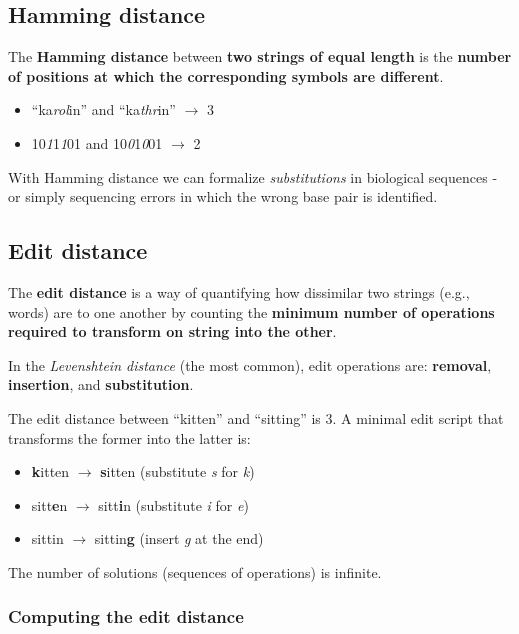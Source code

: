 \documentclass[12pt, letterpaper]{article}
\begin{document}
\subsection{Hamming distance}

The \textbf{Hamming distance} between \textbf{two strings of equal length} is the \textbf{number of positions at which the corresponding symbols are different}.

\begin{itemize}
\item ``ka\emph{rol}in'' and ``ka\emph{thr}in'' $\rightarrow$ 3
\item 10\emph{1}1\emph{1}01 and 10\emph{0}1\emph{0}01 $\rightarrow$ 2
\end{itemize}

With Hamming distance we can formalize \emph{substitutions} in biological sequences - or simply sequencing errors in which the wrong base pair is identified.

\subsection{Edit distance}

The \textbf{edit distance} is a way of quantifying how dissimilar two strings (e.g., words) are to one another by counting the \textbf{minimum number of operations required to transform on string into the other}.

In the \emph{Levenshtein distance} (the most common), edit operations are: \textbf{removal}, \textbf{insertion}, and \textbf{substitution}.

The edit distance between ``kitten'' and ``sitting'' is 3. A minimal edit script that transforms the former into the latter is:

\begin{itemize}
\item \textbf{k}itten $\rightarrow$ \textbf{s}itten (substitute \emph{s} for \emph{k})
\item sitt\textbf{e}n $\rightarrow$ sitt\textbf{i}n (substitute \emph{i} for \emph{e})
\item sittin $\rightarrow$ sittin\textbf{g} (insert \emph{g} at the end)
\end{itemize}

The number of solutions (sequences of operations) is infinite.

\subsubsection{Computing the edit distance}
\end{document}
